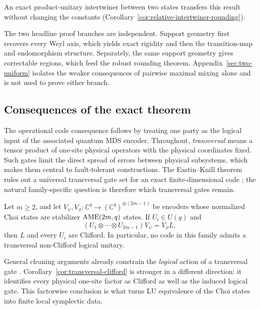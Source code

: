 An exact product-unitary intertwiner between two states transfers this
result without changing the constants
(Corollary~\ref{cor:relative-intertwiner-rounding}).

The two headline proof branches are independent.  Support geometry first
recovers every Weyl axis, which yields exact rigidity and then the
transition-map and endomorphism structure.  Separately, the same support
geometry gives correctable regions, which feed the robust rounding theorem.
Appendix~\ref{sec:two-uniform} isolates the weaker consequences of pairwise
maximal mixing alone and is not used to prove either branch.

\subsection*{Consequences of the exact theorem}

The operational code consequence follows by treating one party as the
logical input of the associated quantum MDS encoder.  Throughout,
\emph{transversal} means a tensor product of one-site physical operators
with the physical coordinates fixed.  Such gates limit the direct spread
of errors between physical subsystems, which makes them central to
fault-tolerant constructions.  The Eastin--Knill theorem rules out a
universal transversal gate set for an exact finite-dimensional code
\cite{EastinKnill2009}; the natural family-specific question is therefore
which transversal gates remain.

\begin{corollary}
\label{cor:transversal-clifford}
Let \(m\geq2\), and let \(V_\psi,V_\phi:\mathbb C^q\to
(\mathbb C^q)^{\otimes(2m-1)}\) be encoders whose normalized Choi states
are stabilizer \(\mathrm{AME}(2m,q)\) states.  If \(U_i\in U(q)\) and
\[
 (U_1\otimes\cdots\otimes U_{2m-1})V_\psi=V_\phi L,
\]
then \(L\) and every \(U_i\) are Clifford.  In particular, no code in
this family admits a transversal non-Clifford logical unitary.
\end{corollary}

General cleaning arguments already constrain the \emph{logical} action of
a transversal gate \cite[Lemma~5]{PastawskiYoshida2015}.
Corollary~\ref{cor:transversal-clifford} is stronger in
a different direction: it identifies every physical one-site factor as
Clifford as well as the induced logical gate.  This factorwise conclusion
is what turns LU equivalence of the Choi states into finite local
symplectic data.

